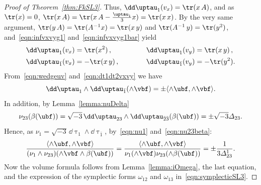 \begin{proof}[Proof of Theorem~\ref{thm:FkSL3}]
Thus, $\dd \uptau_1(v_x)=\tr(x\, A)$, and as $\tr(x)=0$, $\tr(x\, A)=\tr(x\, A- \frac{\uptau_1}{3}x)=\tr(x\, x)$. By the very same argument, $\tr(y\, A)=\tr(A^{-1}x)=\tr(x\, y)$ and $\tr(A^{-1}\, y)=\tr(y^2)$, and~\eqref{eqn:infvxvyg1} and~\eqref{eqn:infvxvyg1bar} yield
\begin{equation}\label{eqn:dt1dt2vxvy}
\begin{aligned}
\dd \uptau_1(v_x)&=\tr(x^2)\,, \qquad\qquad & \dd \uptau_1(v_y)&=\tr(x\, y)\,, \\
\dd \uptau_{\bar 1}(v_x)&=-\tr(x\, y)\,, & \dd \uptau_{\bar 1}(v_y)&=-\tr(y^2).
\end{aligned}
\end{equation}
From~\eqref{eqn:wedgeuv} and~\eqref{eqn:dt1dt2vxvy} we have
\begin{equation}\label{eqn:nu1}
\dd \uptau_1\wedge \dd \uptau_{\bar 1} (\wedge \vbf)= \pm \langle \wedge\ubf, \wedge\vbf \rangle.
\end{equation}
In addition, by Lemma~\ref{lemma:nuDelta}
\begin{equation}\label{eqn:nu23beta}
\nu_{23} (\beta(\ubf))= \sqrt{-3}\, \dd \uptau_{23}\wedge \dd \uptau_{\bar 2\bar 3} (\beta(\ubf)) = \pm\sqrt{-3} \varDelta_{23}.
\end{equation}
Hence, as $\nu_1=\sqrt{-3 } \, \dd \uptau_{1}\wedge \dd \uptau_{\bar 1}$, by~\eqref{eqn:nu1} and~\eqref{eqn:nu23beta}:
\[
\frac{ \langle \wedge\ubf, \wedge\vbf \rangle }{ (\nu_1 \wedge \nu_{23}) (\wedge\vbf\wedge\beta(\ubf)) } =
\frac{ \langle \wedge\ubf, \wedge\vbf \rangle }{\nu_1(\wedge\vbf)\nu_{23}(\wedge\beta(\ubf)) } =\pm\frac{1}{ 3\varDelta^1_{23}}.
\]
Now the volume formula follows from Lemma~\ref{lemma:iOmega}, the last equation, and the expression of the symplectic forms $\omega_{12}$ and $\omega_{13}$ in~\eqref{eqn:symplecticSL3}.
\end{proof}


